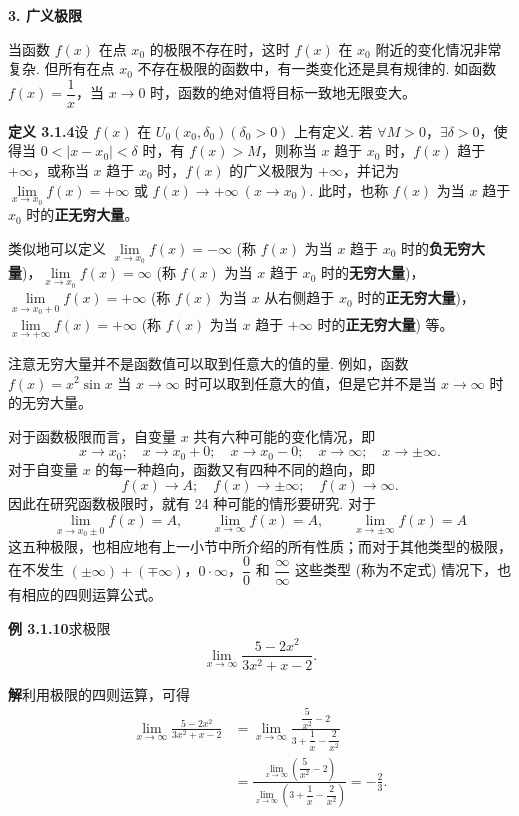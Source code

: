 \documentclass[UTF8,12pt,a4paper,fontset=fandol]{ctexart}
\begin{document}
\noindent\textbf{3. 广义极限}

当函数 $f(x)$ 在点 $x_0$ 的极限不存在时，这时 $f(x)$ 在 $x_0$ 附近的变化情况非常复杂. 但所有在点 $x_0$ 不存在极限的函数中，有一类变化还是具有规律的. 如函数 $f(x)=\dfrac1x$，当 $x\to0$ 时，函数的绝对值将目标一致地无限变大。

\noindent\textbf{定义 3.1.4}\quad 设 $f(x)$ 在 $U_0(x_0,\delta_0)(\delta_0>0)$ 上有定义. 若 $\forall M>0$，$\exists\delta>0$，使得当 $0<|x-x_0|<\delta$ 时，有 $f(x)>M$，则称当 $x$ 趋于 $x_0$ 时，$f(x)$ 趋于 $+\infty$，或称当 $x$ 趋于 $x_0$ 时，$f(x)$ 的广义极限为 $+\infty$，并记为 $\lim\limits_{x\to x_0}f(x)=+\infty$ 或 $f(x)\to+\infty\ (x\to x_0)$. 此时，也称 $f(x)$ 为当 $x$ 趋于 $x_0$ 时的\textbf{正无穷大量}。

类似地可以定义 $\lim\limits_{x\to x_0}f(x)=-\infty$ (称 $f(x)$ 为当 $x$ 趋于 $x_0$ 时的\textbf{负无穷大量})，$\lim\limits_{x\to x_0}f(x)=\infty$ (称 $f(x)$ 为当 $x$ 趋于 $x_0$ 时的\textbf{无穷大量})，$\lim\limits_{x\to x_0+0}f(x)=+\infty$ (称 $f(x)$ 为当 $x$ 从右侧趋于 $x_0$ 时的\textbf{正无穷大量})，$\lim\limits_{x\to+\infty}f(x)=+\infty$ (称 $f(x)$ 为当 $x$ 趋于 $+\infty$ 时的\textbf{正无穷大量}) 等。

注意无穷大量并不是函数值可以取到任意大的值的量. 例如，函数 $f(x)=x^2\sin x$ 当 $x\to\infty$ 时可以取到任意大的值，但是它并不是当 $x\to\infty$ 时的无穷大量。

对于函数极限而言，自变量 $x$ 共有六种可能的变化情况，即
\[
  x\to x_0;\quad x\to x_0+0;\quad x\to x_0-0;\quad x\to\infty;\quad x\to\pm\infty.
\]
对于自变量 $x$ 的每一种趋向，函数又有四种不同的趋向，即
\[
  f(x)\to A;\quad f(x)\to\pm\infty;\quad f(x)\to\infty.
\]
因此在研究函数极限时，就有 24 种可能的情形要研究. 对于
\[
  \lim_{x\to x_0\pm0}f(x)=A,\qquad
  \lim_{x\to\infty}f(x)=A,\qquad
  \lim_{x\to\pm\infty}f(x)=A
\]
这五种极限，也相应地有上一小节中所介绍的所有性质；而对于其他类型的极限，在不发生 $(\pm\infty)+(\mp\infty)$，$0\cdot\infty$，$\dfrac00$ 和 $\dfrac{\infty}{\infty}$ 这些类型 (称为不定式) 情况下，也有相应的四则运算公式。

\noindent\textbf{例 3.1.10}\quad 求极限
\[
  \lim_{x\to\infty}\frac{5-2x^2}{3x^2+x-2}.
\]

\noindent\textbf{解}\quad 利用极限的四则运算，可得
\[
\begin{aligned}
  \lim_{x\to\infty}\frac{5-2x^2}{3x^2+x-2}
  &=\lim_{x\to\infty}\frac{\dfrac5{x^2}-2}{3+\dfrac1x-\dfrac2{x^2}}\\
  &=\frac{\lim\limits_{x\to\infty}\left(\dfrac5{x^2}-2\right)}
  {\lim\limits_{x\to\infty}\left(3+\dfrac1x-\dfrac2{x^2}\right)}
  =-\frac23.
\end{aligned}
\]
\end{document}
